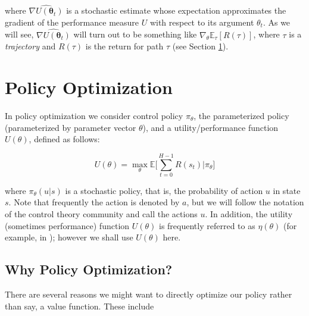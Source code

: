 \documentclass[11pt, oneside]{article}					%
\begin{document}
\bigskip
\noindent
where $\widehat{\nabla U(\boldsymbol{\theta}_t)}$ is a stochastic
estimate whose expectation approximates the gradient of the
performance measure $U$ with respect to its argument
$\theta_t$. As we will see, $\widehat{\nabla
U(\boldsymbol{\theta}_t)}$ will turn out to be something like
$\nabla_{\theta} \mathbb{E}_{\tau}[R(\tau)]$, where $\tau$ is a
\emph{trajectory} and $R(\tau)$ is the return for path $\tau$
(see Section \ref{sec:scorefunction}).




\section{Policy Optimization}
\label{sec:scorefunction}
In policy optimization we consider control policy $\pi_{\theta}$,
the parameterized policy (parameterized by parameter vector
$\theta$), and a utility/performance function $U(\theta)$,
defined as follows:

\begin{equation*}
U(\theta) = \max_\theta \mathbb{E} \Bigg [\sum\limits_{t = 0}^{H
- 1} R(s_t) | \pi_\theta \Bigg ] 
\end{equation*}

\bigskip
\noindent 
where $\pi_{\theta}(u | s)$ is a stochastic policy, that is, the
probability of action $u$ in state $s$. Note that frequently the
action is denoted by $a$, but we will follow the notation of the
control theory community and call the actions $u$. In addition,
the utility (sometimes performance) function $U(\theta)$ is
frequently referred to as $\eta(\theta)$ (for example, in
\cite{Baxter:2001:IPE:1622845.1622855}); however we shall use
$U(\theta)$ here.

\subsection{Why Policy Optimization?}
There are several reasons we might want to directly optimize our
policy rather than say, a value function. These include 
\end{document}
